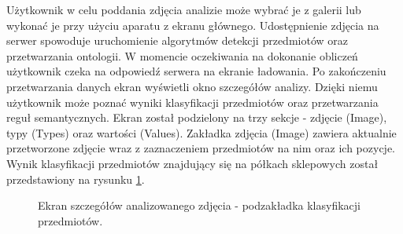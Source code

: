 {Użytkownik w celu poddania zdjęcia analizie może wybrać je z galerii lub wykonać je przy użyciu aparatu z ekranu głównego. Udostępnienie zdjęcia na serwer spowoduje uruchomienie algorytmów detekcji przedmiotów oraz przetwarzania ontologii. W momencie oczekiwania na dokonanie obliczeń użytkownik czeka na odpowiedź serwera na ekranie ładowania. Po zakończeniu przetwarzania danych ekran wyświetli okno szczegółów analizy. Dzięki niemu użytkownik może poznać wyniki klasyfikacji przedmiotów oraz przetwarzania reguł semantycznych. Ekran został podzielony na trzy sekcje - zdjęcie (Image), typy (Types) oraz wartości (Values). Zakładka zdjęcia (Image) zawiera aktualnie przetworzone zdjęcie wraz z zaznaczeniem przedmiotów na nim oraz ich pozycje. Wynik klasyfikacji przedmiotów znajdujący się na półkach sklepowych został przedstawiony na rysunku \ref{fig:classificationImages}. 
\begin{figure}[h]
	\centering
	\quad
	\caption{Ekran szczegółów analizowanego zdjęcia - podzakładka klasyfikacji przedmiotów.}
	\label{fig:classificationImages}
	

\end{figure}}
